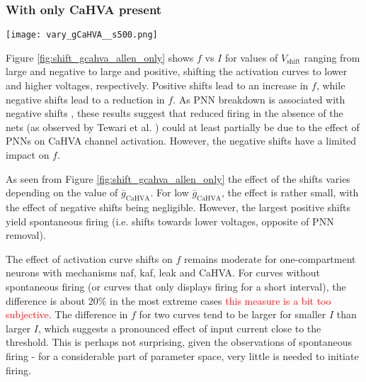 \documentclass[times, twoside]{zHenriquesLab-StyleBioRxiv}
\begin{document}
\subsubsection*{With only CaHVA present}

\begin{figure*} %
\centering
\texttt{[image: vary\_gCaHVA\_\_s500.png]}
\caption{$f-I$ curves for different shifts $V_\text{shift}$ of the activation curve for different values of $\bar{g}_\text{CaHVA}$. A) 0.1$\bar{g}_\text{CaHVA}$, B) 0.5$\bar{g}_\text{CaHVA}$, C) 1.0$\bar{g}_\text{CaHVA}$, D) 2.0$\bar{g}_\text{CaHVA}$. $\bar{g}_\text{CaHVA}$ is the default value as defined in Section \ref{sec:methods}.}
\label{fig:shift_gcahva_allen_only}
\end{figure*}


Figure \ref{fig:shift_gcahva_allen_only} shows $f$ vs $I$ for values of $V_\text{shift}$ ranging from large and negative to large and positive, shifting the activation curves to lower and higher voltages, respectively. Positive shifts lead to an increase in $f$, while negative shifts lead to a reduction in $f$. As PNN breakdown is associated with negative shifts \cite{vigetti_chondroitin_2008}, these results suggest that reduced firing in the absence of the nets (as observed by Tewari et al. \cite{tewari_perineuronal_2018}) could at least partially be due to the effect of PNNs on CaHVA channel activation. However, the negative shifts have a limited impact on $f$.

As seen from Figure \ref{fig:shift_gcahva_allen_only} the effect of the shifts varies depending on the value of $\bar{g}_\text{CaHVA}$. For low $\bar{g}_\text{CaHVA}$, the effect is rather small, with the effect of negative shifts being negligible. %
However, the largest positive shifts yield spontaneous firing (i.e. shifts towards lower voltages, opposite of PNN removal). %

The effect of activation curve shifts on $f$ remains moderate for one-compartment neurons with mechanisms naf, kaf, leak and CaHVA. For curves without spontaneous firing (or curves that only displays firing for a short interval), the difference is about 20\% in the most extreme cases \textcolor{red}{this measure is a bit too subjective}. The difference in $f$ for two curves tend to be larger for smaller $I$ than larger $I$, which suggests a pronounced effect of input current close to the threshold. This is perhaps not surprising, given the observations of spontaneous firing - for a considerable part of parameter space, very little is needed to initiate firing.
\end{document}
